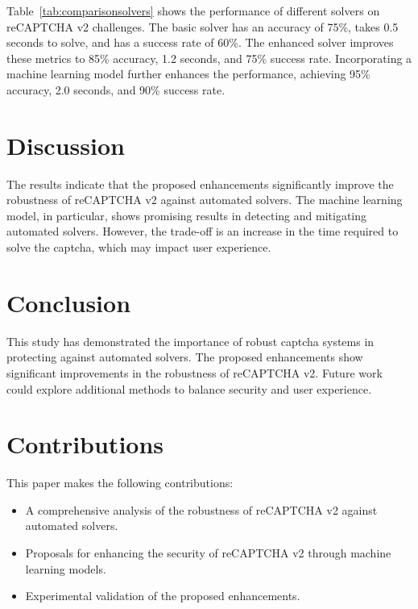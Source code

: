 \documentclass{article}
\begin{document}
Table~\ref{tab:comparisonsolvers} shows the performance of different solvers on reCAPTCHA v2 challenges. The basic solver has an accuracy of 75\%, takes 0.5 seconds to solve, and has a success rate of 60\%. The enhanced solver improves these metrics to 85\% accuracy, 1.2 seconds, and 75\% success rate. Incorporating a machine learning model further enhances the performance, achieving 95\% accuracy, 2.0 seconds, and 90\% success rate.

\section{Discussion}
The results indicate that the proposed enhancements significantly improve the robustness of reCAPTCHA v2 against automated solvers. The machine learning model, in particular, shows promising results in detecting and mitigating automated solvers. However, the trade-off is an increase in the time required to solve the captcha, which may impact user experience.

\section{Conclusion}
This study has demonstrated the importance of robust captcha systems in protecting against automated solvers. The proposed enhancements show significant improvements in the robustness of reCAPTCHA v2. Future work could explore additional methods to balance security and user experience.

\section{Contributions}
This paper makes the following contributions:
\begin{itemize}
    \item A comprehensive analysis of the robustness of reCAPTCHA v2 against automated solvers.
    \item Proposals for enhancing the security of reCAPTCHA v2 through machine learning models.
    \item Experimental validation of the proposed enhancements.
\end{itemize}



\end{document}
